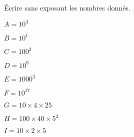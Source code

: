 
Écrire sans exposant les nombres donnés.

\begin{enumerate}
\begin{minipage}{0.3\linewidth}
\item $A=10^3$
\item $B=10^1$
\item $C=100^2$ 
\end{minipage}
\hfill
\begin{minipage}{0.25\linewidth}
\item $D=10^{9}$
\item $E=1000^{3}$ 
\item $F=10^{17}$ 
\end{minipage}
\hfill
\begin{minipage}{0.35\linewidth}
\item $G=10 \times 4 \times 25$
\item $H=100 \times 40 \times 5^2$
\item $I=10 \times 2 \times 5$ 
\end{minipage}
\end{enumerate}